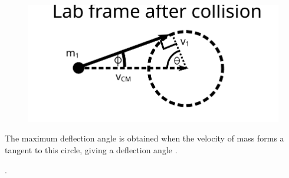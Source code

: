 \begin{problem}
{\begin{figure}[h]
\centering
\includegraphics[width=1.0\textwidth]{../../../figures/dynamics_lab_frame_deflection.svg}
\caption{}\label{fig:dynamics_lab_frame_deflection}
\end{figure}

The maximum deflection angle is obtained when the velocity of mass  forms a tangent to this circle, giving a deflection angle \vari{\phi}.

.  
}
\end{problem}


